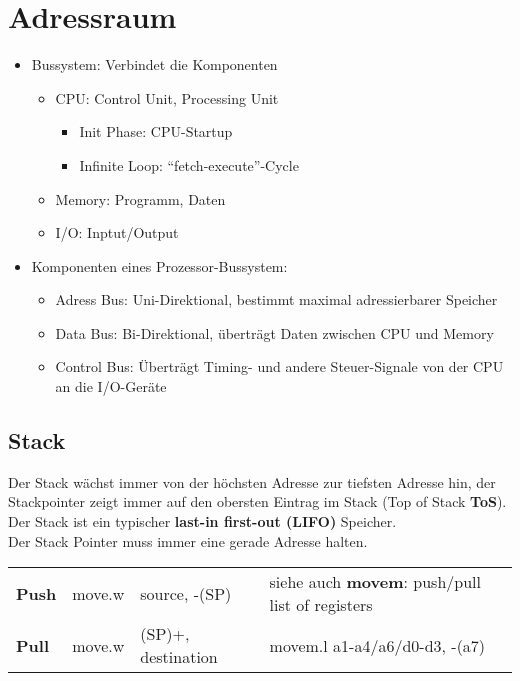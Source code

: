 \section{Adressraum}
\begin{multicols}{2}
\begin{itemize}
  \item Bussystem: Verbindet die Komponenten
  	\begin{itemize}
  		\item CPU: Control Unit, Processing Unit
  			\begin{itemize}
  				\item Init Phase: CPU-Startup
  				\item Infinite Loop: "`fetch-execute"'-Cycle
			\end{itemize}
  		\item Memory: Programm, Daten
  		\item I/O: Inptut/Output
	\end{itemize}
  \item Komponenten eines Prozessor-Bussystem:
  	\begin{itemize}
  		\item Adress Bus: Uni-Direktional, bestimmt maximal adressierbarer Speicher
  		\item Data Bus: Bi-Direktional, überträgt Daten zwischen CPU und Memory
  		\item Control Bus: Überträgt Timing- und andere Steuer-Signale von der CPU an die I/O-Geräte
	\end{itemize}
\end{itemize}
\end{multicols}

\subsection{Stack}
Der Stack wächst immer von der höchsten Adresse zur tiefsten Adresse hin, der Stackpointer zeigt immer auf den obersten Eintrag im Stack (Top of Stack \textbf{ToS}).
Der Stack ist ein typischer \textbf{last-in first-out (LIFO)} Speicher. \\
Der Stack Pointer muss immer eine gerade Adresse halten. \\
\begin{tabular}{lll|l}
	\textbf{Push}	& move.w	& source, -(SP)			& siehe auch \textbf{movem}: push/pull list of registers \\
	\textbf{Pull}	& move.w	& (SP)+, destination	& movem.l \quad a1-a4/a6/d0-d3, -(a7)
\end{tabular}


